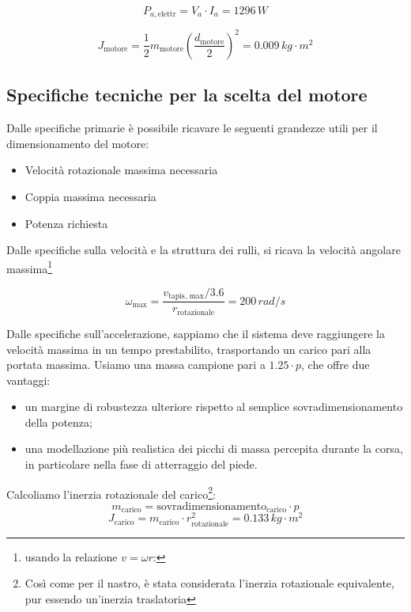 \documentclass[a4paper,12pt]{article}
\begin{document}
\[
    P_{a, \text{elettr}} = V_a \cdot I_a = 1296\,W
\]

\[
    J_{\text{motore}} = \frac{1}{2} m_{\text{motore}} \left(\frac{d_{\text{motore}}}{2}\right)^2 = 0.009 \, kg \cdot m^2
\]

\vspace{0.5em}

\subsection{Specifiche tecniche per la scelta del motore}

Dalle specifiche primarie è possibile ricavare le seguenti grandezze utili per il dimensionamento del motore:

\begin{itemize}
    \item Velocità rotazionale massima necessaria
    \item Coppia massima necessaria
    \item Potenza richiesta
\end{itemize}

\vspace{0.5em}

Dalle specifiche sulla velocità e la struttura dei rulli, si ricava la velocità angolare massima\footnote{usando la relazione \( v = \omega r \):}

\[
    \omega_{\text{max}} = \frac{v_{\text{tapis, max}} / 3.6}{r_{\text{rotazionale}}} = 200 \,rad/s
\]

\vspace{0.5em}
 
Dalle specifiche sull'accelerazione, sappiamo che il sistema deve raggiungere la velocità massima in un tempo prestabilito, trasportando un carico pari alla portata massima. Usiamo una massa campione pari a \(1.25 \cdot p\), che offre due vantaggi:

\begin{itemize}
    \item un margine di robustezza ulteriore rispetto al semplice sovradimensionamento della potenza;
    \item una modellazione più realistica dei picchi di massa percepita durante la corsa, in particolare nella fase di atterraggio del piede.
\end{itemize}

\vspace{0.5em}

Calcoliamo l'inerzia rotazionale del carico\footnote{Così come per il nastro, è stata considerata l'inerzia rotazionale equivalente, pur essendo un'inerzia traslatoria}:
\[
    m_{\text{carico}} = \text{sovradimensionamento}_{\text{carico}} \cdot       p
\]
\[
    J_{\text{carico}} = m_{\text{carico}} \cdot r_{\text{rotazionale}}^2= 0.133 \, kg \cdot m^2
\]
\end{document}
